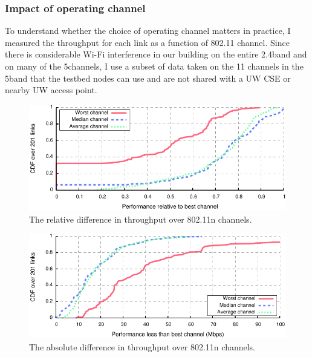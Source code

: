\subsubsection{Impact of operating channel}
To understand whether the choice of operating channel matters in practice, I measured the throughput for each link as a function of 802.11 channel. Since there is considerable Wi-Fi interference in our building on the entire 2.4\GHz band and on many of the 5\GHz channels, I use a subset of data taken on the 11 channels in the 5\GHz band that the testbed nodes can use and are not shared with a UW CSE or nearby UW access point.

\begin{figure}[tp]
	\centering
	\includegraphics[width=\textwidth]{figures/applications/chan_sel_rel_diff.pdf}
	\caption{\label{fig:rel_diff}The relative difference in throughput over 802.11n channels.}
\end{figure}

\begin{figure}[tp]
	\centering
	\includegraphics[width=\textwidth]{figures/applications/chan_sel_tpt_diff.pdf}
	\caption{\label{fig:tpt_diff}The absolute difference in throughput over 802.11n channels.}
\end{figure}

